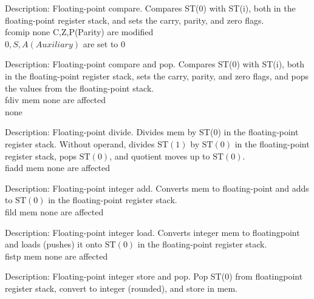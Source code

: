 \documentclass[10pt]{article}
\begin{document}
Description: Floating-point compare. Compares ST(0) with ST(i), both in the floating-point register stack, and sets the carry, parity, and zero flags.\\
fcomip none C,Z,P(Parity) are modified\\
$0, S, A(A u x i l i a r y)$ are set to 0

Description: Floating-point compare and pop. Compares ST(0) with ST(i), both in the floating-point register stack, sets the carry, parity, and zero flags, and pops the values from the floating-point stack.\\
fdiv mem none are affected\\
none

Description: Floating-point divide. Divides mem by ST(0) in the floating-point register stack. Without operand, divides $\mathrm{ST}(1)$ by $\mathrm{ST}(0)$ in the floating-point register stack, pops $\mathrm{ST}(0)$, and quotient moves up to $\mathrm{ST}(0)$.\\
fiadd mem none are affected

Description: Floating-point integer add. Converts mem to floating-point and adds to $\mathrm{ST}(0)$ in the floating-point register stack.\\
fild mem none are affected

Description: Floating-point integer load. Converts integer mem to floatingpoint and loads (pushes) it onto $\mathrm{ST}(0)$ in the floating-point register stack.\\
fistp mem none are affected

Description: Floating-point integer store and pop. Pop ST(0) from floatingpoint register stack, convert to integer (rounded), and store in mem.
\end{document}
